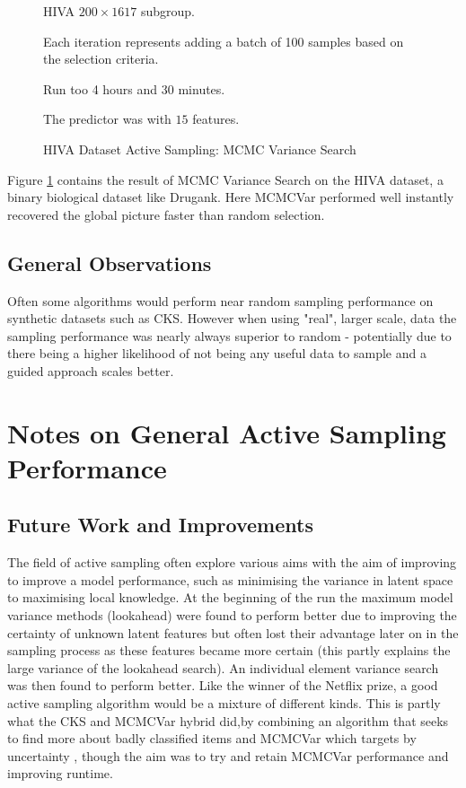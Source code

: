 \begin{figure}[!htbp]
  \begin{center}
    \resizebox{\textwidth}{!}{}
  \end{center}
  HIVA $200 \times 1617$ subgroup.
  
   Each iteration represents adding a batch of 100 samples based on the selection criteria.
   
   Run too 4 hours and 30 minutes.
  
   The predictor was with $15$ features.
      
    \caption{HIVA Dataset Active Sampling: MCMC Variance Search}
    \label{fig:hiva_mcmcmvar}
\end{figure}
Figure \ref{fig:hiva_mcmcmvar} contains the result of MCMC Variance Search on the HIVA dataset, a binary biological dataset like Drugank. Here MCMCVar performed well instantly recovered the global picture faster than random selection.

\subsection{General Observations}

Often some algorithms would perform near random sampling performance on synthetic datasets such as CKS. However when using "real", larger scale, data the sampling performance was nearly always superior to random - potentially due to there being a higher likelihood of not being any useful data to sample and a guided approach scales better.

\section{Notes on General Active Sampling Performance}
\subsection{Future Work and Improvements}
The field of active sampling often explore various aims with the aim of improving to improve a model performance, such as minimising the variance in latent space to maximising local knowledge. At the beginning of the run the maximum model variance methods (lookahead) were found to perform better due to improving the certainty of unknown latent features but often lost their advantage later on in the sampling process as these features became more certain (this partly explains the large variance of the lookahead search). An individual element variance search was then found to perform better. Like the winner of the Netflix prize, a good active sampling algorithm would be a mixture of different kinds. This is partly what the CKS and MCMCVar hybrid did,by combining an algorithm that seeks to find more about badly classified items and MCMCVar which targets by uncertainty , though the aim was to try and retain MCMCVar performance and improving runtime. 

